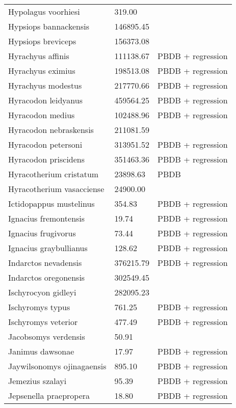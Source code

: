 \documentclass{article}
\begin{document}
\begin{center}
\begin{longtable}{p{} p{} p{}}
    Hypolagus voorhiesi & 319.00 & \cite{McKenna2011} \\ 
    Hypsiops bannackensis & 146895.45 & \cite{Wang1999} \\ 
    Hypsiops breviceps & 156373.08 & \cite{Tomiya2013} \\ 
    Hyrachyus affinis & 111138.67 & PBDB + regression \\ 
    Hyrachyus eximius & 198513.08 & PBDB + regression \\ 
    Hyrachyus modestus & 217770.66 & PBDB + regression \\ 
    Hyracodon leidyanus & 459564.25 & PBDB + regression \\ 
    Hyracodon medius & 102488.96 & PBDB + regression \\ 
    Hyracodon nebraskensis & 211081.59 & \cite{Tomiya2013} \\ 
    Hyracodon petersoni & 313951.52 & PBDB + regression \\ 
    Hyracodon priscidens & 351463.36 & PBDB + regression \\ 
    Hyracotherium cristatum & 23898.63 & PBDB \\ 
    Hyracotherium vasacciense & 24900.00 & \cite{MacFadden1986} \\ 
    Ictidopappus mustelinus & 354.83 & PBDB + regression \\ 
    Ignacius fremontensis & 19.74 & PBDB + regression \\ 
    Ignacius frugivorus & 73.44 & PBDB + regression \\ 
    Ignacius graybullianus & 128.62 & PBDB + regression \\ 
    Indarctos nevadensis & 376215.79 & PBDB + regression \\ 
    Indarctos oregonensis & 302549.45 & \cite{Tomiya2013} \\ 
    Ischyrocyon gidleyi & 282095.23 & \cite{Tomiya2013} \\ 
    Ischyromys typus & 761.25 & PBDB + regression \\ 
    Ischyromys veterior & 477.49 & PBDB + regression \\ 
    Jacobsomys verdensis & 50.91 & \cite{Tomiya2013} \\ 
    Janimus dawsonae & 17.97 & PBDB + regression \\ 
    Jaywilsonomys ojinagaensis & 895.10 & PBDB + regression \\ 
    Jemezius szalayi & 95.39 & PBDB + regression \\ 
    Jepsenella praepropera & 18.80 & PBDB + regression \\ 

\end{longtable}
\end{center}
\end{document}
